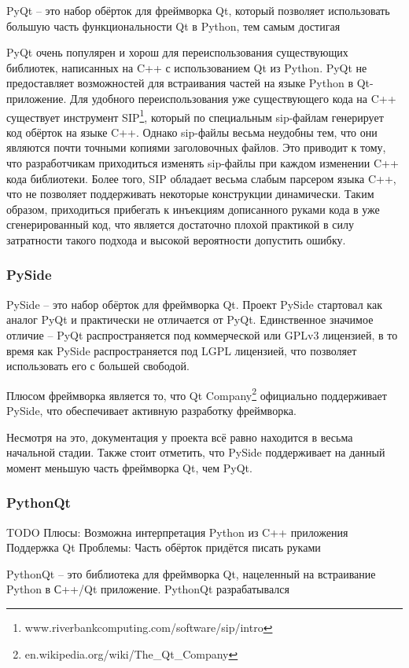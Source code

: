 \documentclass[14pt]{matmex-diploma-custom}
\begin{document}
PyQt \cite{pyqt} -- это набор обёрток для фреймворка Qt, который позволяет использовать большую часть функциональности Qt в Python, тем самым достигая 

PyQt очень популярен и хорош для переиспользования существующих библиотек, написанных на C++ с использованием Qt из Python. PyQt не предоставляет возможностей для встраивания частей на языке Python в Qt-приложение. Для удобного переиспользования уже существующего кода на C++ существует инструмент SIP\footnote{www.riverbankcomputing.com/software/sip/intro}, который по специальным sip-файлам генерирует код обёрток на языке C++. Однако sip-файлы весьма неудобны тем, что они являются почти точными копиями заголовочных файлов. Это приводит к тому, что разработчикам приходиться изменять sip-файлы при каждом изменении C++ кода библиотеки. Более того, SIP обладает весьма слабым парсером языка C++, что не позволяет поддерживать некоторые конструкции динамически. Таким образом, приходиться прибегать к инъекциям дописанного руками кода в уже сгенерированный код, что является достаточно плохой практикой в силу затратности такого подхода и высокой вероятности допустить ошибку.

\subsubsection{PySide}
PySide -- это набор обёрток для фреймворка Qt. Проект PySide стартовал как аналог PyQt и практически не отличается от PyQt. Единственное значимое отличие -- PyQt распространяется под коммерческой или GPLv3 лицензией, в то время как PySide распространяется под LGPL лицензией, что позволяет использовать его с большей свободой. 

Плюсом фреймворка является то, что Qt Company\footnote{en.wikipedia.org/wiki/The\_Qt\_Company} официально поддерживает PySide, что обеспечивает активную разработку фреймворка. 

Несмотря на это, документация у проекта всё равно находится в весьма начальной стадии. Также стоит отметить, что PySide поддерживает на данный момент меньшую часть фреймворка Qt, чем PyQt.

\subsubsection{PythonQt}
TODO
Плюсы:
Возможна интерпретация Python из C++ приложения
Поддержка Qt
Проблемы:
Часть обёрток придётся писать руками

PythonQt -- это библиотека для фреймворка Qt, нацеленный на встраивание Python в С++/Qt приложение. PythonQt разрабатывался
\end{document}

